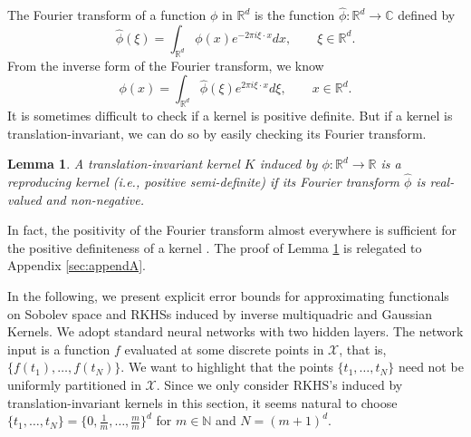 \documentclass{article}
\def\NN{\mathbb N}
\def\RR{\mathbb R}
\numberwithin{equation}{section}
\newtheorem{lemma}[theorem]{Lemma}
\begin{document}
The Fourier transform of a function $\phi$ in $\RR^d$ is the function $\widehat{\phi}:  \RR^d \rightarrow \mathbb{C}$ defined by
\begin{equation}
    \widehat{\phi}(\xi) = \int_{\RR^d} \phi(x) e^{-2\pi i\xi \cdot x} dx, \qquad \xi\in \RR^d.
\end{equation}
From the  inverse form of the Fourier transform, we know
\begin{equation}\label{eq:inversefourier}
    \phi(x) = \int_{\RR^d} \widehat{\phi}(\xi) e^{2\pi i\xi \cdot x} d\xi, \qquad x\in \RR^d.
\end{equation}
It is sometimes difficult to check if a kernel is positive definite. But if a kernel is translation-invariant, we can do so by easily checking its Fourier transform.   


\begin{lemma} \label{lemma:trans}
    A translation-invariant kernel $K$ induced by $\phi: \RR^d \to \RR$ is a reproducing kernel (i.e., positive semi-definite) if its Fourier transform $\widehat{\phi}$ is real-valued and non-negative. 
\end{lemma}
In fact, the positivity of the Fourier transform
almost everywhere is sufficient for the positive definiteness of a kernel \citep{schaback2006kernel}. The proof of Lemma \ref{lemma:trans} is
relegated to Appendix \ref{sec:appendA}. 

In the following, we present explicit error bounds for approximating functionals on Sobolev space and RKHSs induced by inverse multiquadric and Gaussian Kernels. We adopt standard neural networks with two hidden layers. 
The network input is a function $f$ evaluated at some discrete points in $\mathcal{X}$, that is, $\{f(t_1), \ldots, f(t_N)\}$.
We want to highlight that the points $\{t_1,\ldots, t_N\}$ need not be uniformly partitioned in $\mathcal{X}$. 
Since we only consider RKHS's induced by translation-invariant kernels in this section, it seems natural to choose $\{t_1,\ldots, t_N\} = \{0, \frac{1}{m},\ldots, \frac{m}{m}\}^d$ for $m\in \NN$ and $N = (m+1)^d$. 
\end{document}
